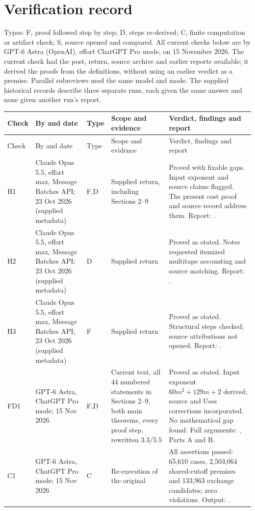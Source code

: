 \documentclass[11pt,a4paper]{article}
\theoremstyle{plain}
\theoremstyle{definition}
\newcommand{\fixedhead}[1]{\section*{#1}}
\begin{document}
\fixedhead{Verification record}
Types: F, proof followed step by step; D, steps re-derived; C, finite computation or artifact check; S, source opened and compared. All current checks below are by GPT-6 Astra (OpenAI), effort ChatGPT Pro mode, on 15 November 2026. The current check had the post, return, source archive and earlier reports available; it derived the proofs from the definitions, without using an earlier verdict as a premise. Parallel subreviews used the same model and mode. The supplied historical records describe three separate runs, each given the same answer and none given another run's report.

{\footnotesize
\begin{longtable}{@{}L{1.0cm}L{2.8cm}L{0.7cm}L{3.8cm}L{6.0cm}@{}}
\toprule
Check & By and date & Type & Scope and evidence & Verdict, findings and report\\
\midrule
\endfirsthead
\toprule
Check & By and date & Type & Scope and evidence & Verdict, findings and report\\
\midrule
\endhead
\bottomrule
\endfoot
H1 & Claude Opus 5.5, effort max, Message Batches API; 23 Oct 2026 (supplied metadata) & F,D & Supplied return, including Sections 2--9 & Proved with fixable gaps. Input exponent and source claims flagged. The present cost proof and source record address them. Report: .\\[3pt]
H2 & Claude Opus 5.5, effort max, Message Batches API; 23 Oct 2026 (supplied metadata) & D & Supplied return & Proved as stated. Notes requested itemized multitape accounting and source matching. Report: .\\[3pt]
H3 & Claude Opus 5.5, effort max, Message Batches API; 23 Oct 2026 (supplied metadata) & F & Supplied return & Proved as stated. Structural steps checked; source attributions not opened. Report: .\\[3pt]
FD1 & GPT-6 Astra, ChatGPT Pro mode; 15 Nov 2026 & F,D & Current text, all 44 numbered statements in Sections 2--9, both main theorems, every proof step, rewritten 3.3/5.5 & Proved as stated. Input exponent $60m^2+129m+2$ derived; source and Uses corrections incorporated. No mathematical gap found. Full arguments: , Parts A and B.\\[3pt]
C1 & GPT-6 Astra, ChatGPT Pro mode; 15 Nov 2026 & C & Re-execution of the original  & All assertions passed: 65,610 cases, 2,503,064 shared-cutoff premises and 133,963 exchange candidates; zero violations. Output: .\\[3pt]

\end{longtable}}
\end{document}

